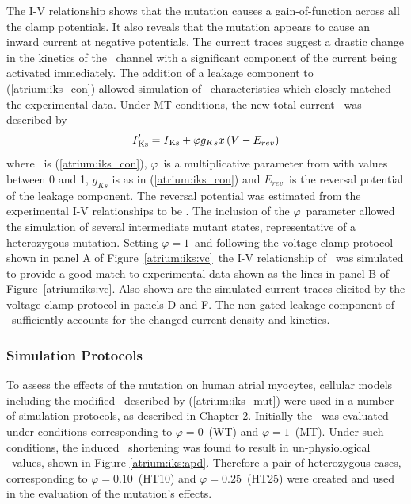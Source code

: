 The I-V relationship shows that the mutation causes a gain-of-function across
all the clamp potentials.
It also reveals that the mutation appears to cause an inward current at negative
potentials.
The current traces suggest a drastic change in the kinetics of the \
channel with a significant component of the current being activated immediately.
The addition of a leakage component to (\ref{atrium:iks_con}) allowed simulation
of \ii{Ks}\ characteristics which closely matched the experimental data.
Under MT conditions, the new total current \iip{Ks}\ was described by
\begin{equation}
\label{atrium:iks_mut}
\text{\emph{I}}'_{\text{Ks}} = \text{\emph{I}}_{\text{Ks}} + \varphi g_{Ks}x\left(V-E_{rev}\right)
\end{equation}
where \ is (\ref{atrium:iks_con}), $\varphi$\ is a multiplicative parameter
from with values between 0 and 1, $g_{Ks}$ is as in (\ref{atrium:iks_con}) and
$E_{rev}$\ is the reversal potential of the leakage component.
The reversal potential was estimated from the experimental I-V relationships to be
\mv{-76.3}.
The inclusion of the $\varphi$\ parameter allowed the simulation of several
intermediate mutant states, representative of a heterozygous mutation.
Setting $\varphi = 1$\ and following the voltage clamp protocol shown in panel A
of Figure~\ref{atrium:iks:vc}\ the I-V relationship of \ii{Ks}\ was simulated to
provide a good match to experimental data shown as the lines in panel B of
Figure~\ref{atrium:iks:vc}.
Also shown are the simulated current traces elicited by the voltage clamp
protocol in panels D and F.
The non-gated leakage component of \ sufficiently accounts for the
changed current density and kinetics.

\subsubsection{Simulation Protocols}
\label{sec:atrium:s140g:methods}
To assess the effects of the mutation on human atrial myocytes, cellular models
including the modified \iip{Ks}\ described by (\ref{atrium:iks_mut}) were used
in a number of simulation protocols, as described in Chapter 2.
Initially the \apd\ was evaluated under conditions corresponding to $\varphi =
0$\ (WT) and $\varphi = 1$\ (MT).
Under such conditions, the induced \apd\ shortening was found to result in
un-physiological \apd\ values, shown in Figure \ref{atrium:iks:apd}.
Therefore a pair of heterozygous cases, corresponding to $\varphi = 0.10$\
(HT10) and $\varphi = 0.25$\ (HT25) were created and used in the evaluation of
the mutation's effects.

